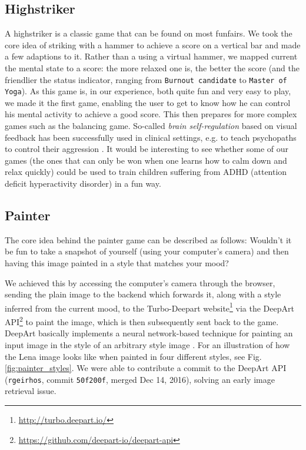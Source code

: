 \documentclass{utue} %
\begin{document}
\subsection{Highstriker}
A highstriker is a classic game that can be found on most funfairs. We took the core idea of striking with a hammer to achieve a score on a vertical bar and made a few adaptions to it. Rather than a using a virtual hammer, we mapped current the mental state to a score: the more relaxed one is, the better the score (and the friendlier the status indicator, ranging from \texttt{Burnout candidate} to \texttt{Master of Yoga}). As this game is, in our experience, both quite fun and very easy to play, we made it the first game, enabling the user to get to know how he can control his mental activity to achieve a good score. This then prepares for more complex games such as the balancing game. So-called \textit{brain self-regulation} based on visual feedback has been successfully used in clinical settings, e.g. to teach psychopaths to control their aggression \cite{Konicar2015}. It would be interesting to see whether some of our games (the ones that can only be won when one learns how to calm down and relax quickly) could be used to train children suffering from ADHD (attention deficit hyperactivity disorder) in a fun way.

\subsection{Painter}
The core idea behind the painter game can be described as follows: Wouldn't it be fun to take a snapshot of yourself (using your computer's camera) and then having this image painted in a style that matches your mood? 

We achieved this by accessing the computer's camera through the browser, sending the plain image to the backend which forwards it, along with a style inferred from the current mood, to the Turbo-Deepart website\footnote{\url{http://turbo.deepart.io/}} via the DeepArt API\footnote{\url{https://github.com/deepart-io/deepart-api}} to paint the image, which is then subsequently sent back to the game. DeepArt basically implements a neural network-based technique for painting an input image in the style of an arbitrary style image \cite{Gatys2016}. For an illustration of how the Lena image looks like when painted in four different styles, see Fig. \ref{fig:painter_styles}. We were able to contribute a commit to the DeepArt API (\texttt{rgeirhos}, commit \texttt{50f200f}, merged Dec 14, 2016), solving an early image retrieval issue.
\end{document}
